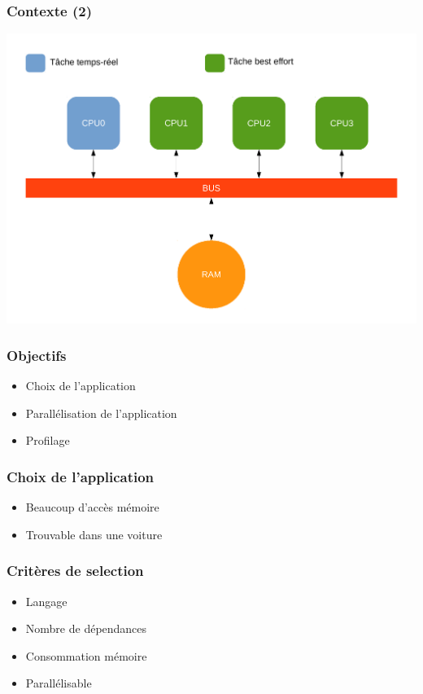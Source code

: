 \begin{frame}
\frametitle{Contexte (2)}
\begin{center}
  \includegraphics[scale=0.3]{include/archi.pdf}
\end{center}
\end{frame}

\begin{frame}
\frametitle{Objectifs}
\begin{itemize}
  \item Choix de l'application
    \vspace{1em}
  \item Parallélisation de l'application
    \vspace{1em}
  \item Profilage
\end{itemize}
\end{frame}

\begin{frame}
\frametitle{Choix de l'application}
\begin{itemize}
  \item Beaucoup d'accès mémoire
    \vspace{1em}
  \item Trouvable dans une voiture
\end{itemize}
\end{frame}

\begin{frame}
\frametitle{Critères de selection}
\begin{itemize}
  \item Langage
    \vspace{1em}
  \item Nombre de dépendances
    \vspace{1em}
  \item Consommation mémoire
    \vspace{1em}
  \item Parallélisable
\end{itemize}
\end{frame}


